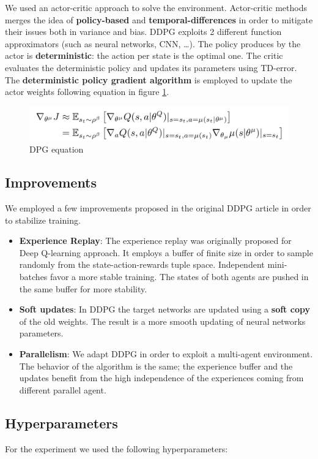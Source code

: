 \documentclass[11pt]{article}
\begin{document}
We used an actor-critic approach to solve the environment. Actor-critic methods
merges the idea of \textbf{policy-based} and \textbf{temporal-differences} in order to
mitigate their issues both in variance and bias. DDPG exploits 2 different
function approximators (such as neural networks, CNN, \ldots{}). The policy produces
by the actor is \textbf{deterministic}: the action per state is the optimal one. The
critic evaluates the deterministic policy and updates its parameters using
TD-error. The \textbf{deterministic policy gradient algorithm} is employed to update
the actor weights following equation in figure \ref{fig:orgcd6f1f9}.


\begin{figure}[htbp]
\centering
\includegraphics[width=.9\linewidth]{../contents/dpg.png}
\caption{\label{fig:orgcd6f1f9}DPG equation}
\end{figure}

\subsection{Improvements}
\label{sec:orge234b3b}
We employed a few improvements proposed in the original DDPG article in order to
stabilize training.

\begin{itemize}
\item \textbf{Experience Replay}: The experience replay was originally proposed for Deep
Q-learning approach. It employs a buffer of finite size in order to sample
randomly from the state-action-rewards tuple space. Independent mini-batches
favor a more stable training. The states of both agents are pushed in the same
buffer for more stability.
\item \textbf{Soft updates}: In DDPG the target networks are updated using a \textbf{soft copy} of
the old weights. The result is a more smooth updating of neural networks
parameters.
\item \textbf{Parallelism}: We adapt DDPG in order to exploit a multi-agent
environment. The behavior of the algorithm is the same; the experience buffer
and the updates benefit from the high independence of the experiences coming
from different parallel agent.
\end{itemize}

\subsection{Hyperparameters}
\label{sec:org38f7ec7}
For the experiment we used the following hyperparameters:
\end{document}
